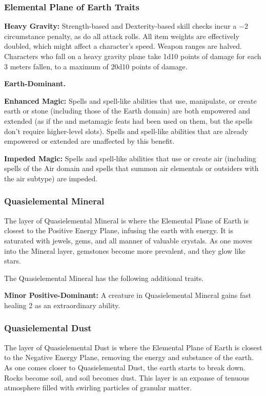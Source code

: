 \subsubsection{Elemental Plane of Earth Traits}
\begin{itemize*}
\item \textbf{Heavy Gravity:} Strength-based and Dexterity-based skill checks incur a $-2$ circumstance penalty, as do all attack rolls. All item weights are effectively doubled, which might affect a character's speed. Weapon ranges are halved. Characters who fall on a heavy gravity plane take 1d10 points of damage for each 3 meters fallen, to a maximum of 20d10 points of damage.
\item \textbf{Earth-Dominant.}
\item \textbf{Enhanced Magic:} Spells and spell-like abilities that use, manipulate, or create earth or stone (including those of the Earth domain) are both empowered and extended (as if the  and  metamagic feats had been used on them, but the spells don't require higher-level slots). Spells and spell-like abilities that are already empowered or extended are unaffected by this benefit.
\item \textbf{Impeded Magic:} Spells and spell-like abilities that use or create air (including spells of the Air domain and spells that summon air elementals or outsiders with the air subtype) are impeded.
\end{itemize*}


\subsubsection{Quasielemental Mineral}
The layer of Quasielemental Mineral is where the Elemental Plane of Earth is closest to the Positive Energy Plane, infusing the earth with energy. It is saturated with jewels, gems, and all manner of valuable crystals. As one moves into the Mineral layer, gemstones become more prevalent, and they glow like stars.

The Quasielemental Mineral has the following additional traits.
\begin{itemize*}
\item \textbf{Minor Positive-Dominant:} A creature in Quasielemental Mineral gains fast healing 2 as an extraordinary ability.
\end{itemize*}

\subsubsection{Quasielemental Dust}
The layer of Quasielemental Dust is where the Elemental Plane of Earth is closest to the Negative Energy Plane, removing the energy and substance of the earth. As one comes closer to Quasielemental Dust, the earth starts to break down. Rocks become soil, and soil becomes dust. This layer is an expanse of tenuous atmosphere filled with swirling particles of granular matter.

